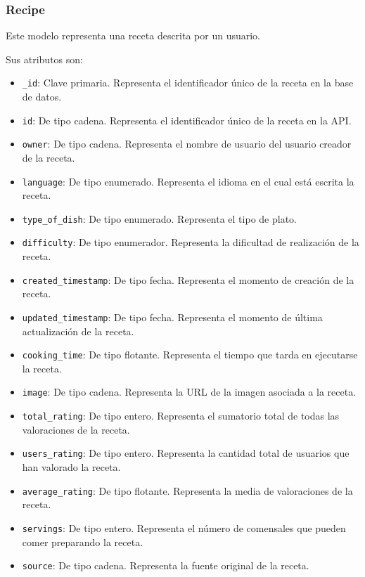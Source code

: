 \subsubsection{Recipe}

Este modelo representa una receta descrita por un usuario.

Sus atributos son:
\begin{itemize}
\item \texttt{\_id}: Clave primaria. Representa el identificador único de la
  receta en la base de datos.
\item \texttt{id}: De tipo cadena. Representa el identificador único de la
  receta en la API.
\item \texttt{owner}: De tipo cadena. Representa el nombre de usuario del
  usuario creador de la receta.
\item \texttt{language}: De tipo enumerado. Representa el idioma en el cual está
  escrita la receta.
\item \texttt{type\_of\_dish}: De tipo enumerado. Representa el tipo de plato.
\item \texttt{difficulty}: De tipo enumerador. Representa la dificultad de
  realización de la receta.
\item \texttt{created\_timestamp}: De tipo fecha. Representa el momento de
  creación de la receta.
\item \texttt{updated\_timestamp}: De tipo fecha. Representa el momento de
  última actualización de la receta.
\item \texttt{cooking\_time}: De tipo flotante. Representa el tiempo que tarda
  en ejecutarse la receta.
\item \texttt{image}: De tipo cadena. Representa la URL de la imagen asociada a
  la receta.
\item \texttt{total\_rating}: De tipo entero. Representa el sumatorio total de
  todas las valoraciones de la receta.
\item \texttt{users\_rating}: De tipo entero. Representa la cantidad total de
  usuarios que han valorado la receta.
\item \texttt{average\_rating}: De tipo flotante. Representa la media de
  valoraciones de la receta.
\item \texttt{servings}: De tipo entero. Representa el número de comensales que
  pueden comer preparando la receta.
\item \texttt{source}: De tipo cadena. Representa la fuente original de la
  receta.
\end{itemize}

